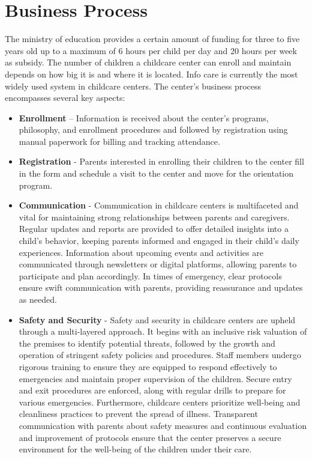 \section{Business Process}
The ministry of education provides a certain amount of funding for three to five years old up to a maximum of 6 hours per child per day and 20 hours per week as subsidy. \cite{ministryofeducation_2023} The number of children a childcare center can enroll and maintain depends on how big it is and where it is located. Info care is currently the most widely used system in childcare centers. The center’s business process encompasses several key aspects:

\begin{itemize}
    \item \textbf{Enrollment} – Information is received about the center’s programs, philosophy, and enrollment procedures and followed by registration using manual paperwork for billing and tracking attendance.
    \item \textbf{Registration} - Parents interested in enrolling their children to the center fill in the form and schedule a visit to the center and move for the orientation program. 
    \item \textbf{Communication} - Communication in childcare centers is multifaceted and vital for maintaining strong relationships between parents and caregivers. Regular updates and reports are provided to offer detailed insights into a child's behavior, keeping parents informed and engaged in their child's daily experiences. Information about upcoming events and activities are communicated through newsletters or digital platforms, allowing parents to participate and plan accordingly. In times of emergency, clear protocols ensure swift communication with parents, providing reassurance and updates as needed. \cite{mitchell2006teachers}
    \item \textbf{Safety and Security} - Safety and security in childcare centers are upheld through a multi-layered approach. It begins with an inclusive risk valuation of the premises to identify potential threats, followed by the growth and operation of stringent safety policies and procedures. Staff members undergo rigorous training to ensure they are equipped to respond effectively to emergencies and maintain proper supervision of the children. Secure entry and exit procedures are enforced, along with regular drills to prepare for various emergencies. Furthermore, childcare centers prioritize well-being and cleanliness practices to prevent the spread of illness. Transparent communication with parents about safety measures and continuous evaluation and improvement of protocols ensure that the center preserves a secure environment for the well-being of the children under their care.  

\end{itemize}
